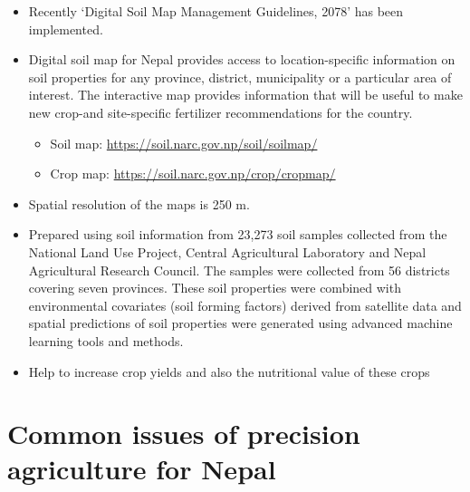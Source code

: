\documentclass[11pt,dvipsnames,ignorenonframetext,aspectratio=169]{beamer}
\providecommand{\tightlist}{%
  \setlength{\itemsep}{0pt}\setlength{\parskip}{0pt}}
\begin{document}
\begin{frame}{}
\protect\hypertarget{section-9}{}
\footnotesize

\begin{itemize}
\tightlist
\item
  Recently `Digital Soil Map Management Guidelines, 2078' has been
  implemented.
\item
  Digital soil map for Nepal provides access to location-specific
  information on soil properties for any province, district,
  municipality or a particular area of interest. The interactive map
  provides information that will be useful to make new crop-and
  site-specific fertilizer recommendations for the country.

  \begin{itemize}
  \footnotesize
  \item Soil map: \url{https://soil.narc.gov.np/soil/soilmap/}
  \item Crop map: \url{https://soil.narc.gov.np/crop/cropmap/}
  \end{itemize}
\item
  Spatial resolution of the maps is 250 m.
\item
  Prepared using soil information from 23,273 soil samples collected
  from the National Land Use Project, Central Agricultural Laboratory
  and Nepal Agricultural Research Council. The samples were collected
  from 56 districts covering seven provinces. These soil properties were
  combined with environmental covariates (soil forming factors) derived
  from satellite data and spatial predictions of soil properties were
  generated using advanced machine learning tools and methods.
\item
  Help to increase crop yields and also the nutritional value of these
  crops
\end{itemize}
\end{frame}

\hypertarget{common-issues-of-precision-agriculture-for-nepal}{%
\section{Common issues of precision agriculture for
Nepal}\label{common-issues-of-precision-agriculture-for-nepal}}
\end{document}
